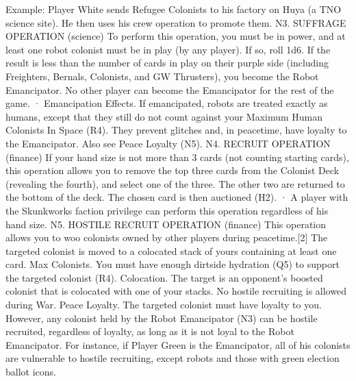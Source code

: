 \documentclass[a4paper]{book}
\begin{document}
Example: Player White sends Refugee Colonists to his factory on Huya (a TNO science site). He then uses his crew operation to promote them.
N3. SUFFRAGE OPERATION (science)
To perform this operation, you must be in power, and at least one robot colonist must be in play (by any player). If so, roll 1d6. If the result is less than the number of cards in play on their purple side (including Freighters, Bernals, Colonists, and GW Thrusters), you become the Robot Emancipator. No other player can become the Emancipator for the rest of the game.
·       Emancipation Effects. If emancipated, robots are treated exactly as humans, except that they still do not count against your Maximum Human Colonists In Space (R4). They prevent glitches and, in peacetime, have loyalty to the Emancipator. Also see Peace Loyalty (N5).
N4. RECRUIT OPERATION (finance)
If your hand size is not more than 3 cards (not counting starting cards), this operation allows you to remove the top three cards from the Colonist Deck (revealing the fourth), and select one of the three. The other two are returned to the bottom of the deck. The chosen card is then auctioned (H2).
·       A player with the Skunkworks faction privilege can perform this operation regardless of his hand size.
N5. HOSTILE RECRUIT OPERATION (finance)
This operation allows you to woo colonists owned by other players during peacetime.[2] The targeted colonist is moved to a colocated stack of yours containing at least one card.
Max Colonists. You must have enough dirtside hydration (Q5) to support the targeted colonist (R4).
Colocation. The target is an opponent’s boosted colonist that is colocated with one of your stacks.
No hostile recruiting is allowed during War.
Peace Loyalty. The targeted colonist must have loyalty to you. However, any colonist held by the Robot Emancipator (N3) can be hostile recruited, regardless of loyalty, as long as it is not loyal to the Robot Emancipator. For instance, if Player Green is the Emancipator, all of his colonists are vulnerable to hostile recruiting, except robots and those with green election ballot icons.
\end{document}
